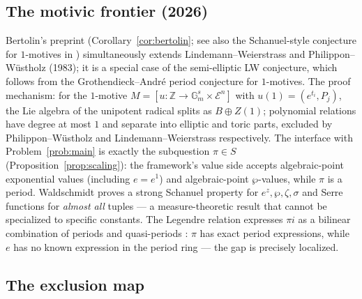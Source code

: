 \documentclass[11pt]{amsart}
\theoremstyle{definition}
\theoremstyle{remark}
\numberwithin{equation}{section}
\newcommand{\Z}{\mathbb{Z}}
\newcommand{\ee}{e}
\begin{document}
\subsection{The motivic frontier (2026)}\label{sub:motivic}

Bertolin's preprint \cite{Bertolin2026} (Corollary~\ref{cor:bertolin}; see also the Schanuel-style conjecture for $1$-motives in \cite{BertolinMotives}) simultaneously extends Lindemann--Weierstrass and Philippon--W\"ustholz (1983); it is a special case of the semi-elliptic LW conjecture, which follows from the Grothendieck--André period conjecture for $1$-motives. The proof mechanism: for the $1$-motive $M=[u:\Z\to\mathbb G_m^s\times\mathcal E^n]$ with $u(1)=(\ee^{t_i},P_j)$, the Lie algebra of the unipotent radical splits as $B\oplus Z(1)$; polynomial relations have degree at most $1$ and separate into elliptic and toric parts, excluded by Philippon--W\"ustholz and Lindemann--Weierstrass respectively. The interface with Problem~\ref{prob:main} is exactly the subquestion $\pi\in S$ (Proposition~\ref{prop:scaling}): the framework's value side accepts algebraic-point exponential values (including $\ee=\ee^1$) and algebraic-point $\wp$-values, while $\pi$ is a period. Waldschmidt \cite{Waldschmidt2025} proves a strong Schanuel property for $\ee^z,\wp,\zeta,\sigma$ and Serre functions for \emph{almost all} tuples --- a measure-theoretic result that cannot be specialized to specific constants. The Legendre relation expresses $\pi i$ as a bilinear combination of periods and quasi-periods \cite{DLMF23}: $\pi$ has exact period expressions, while $\ee$ has no known expression in the period ring --- the gap is precisely localized.

\subsection{The exclusion map}\label{sub:exclusion}
\end{document}
